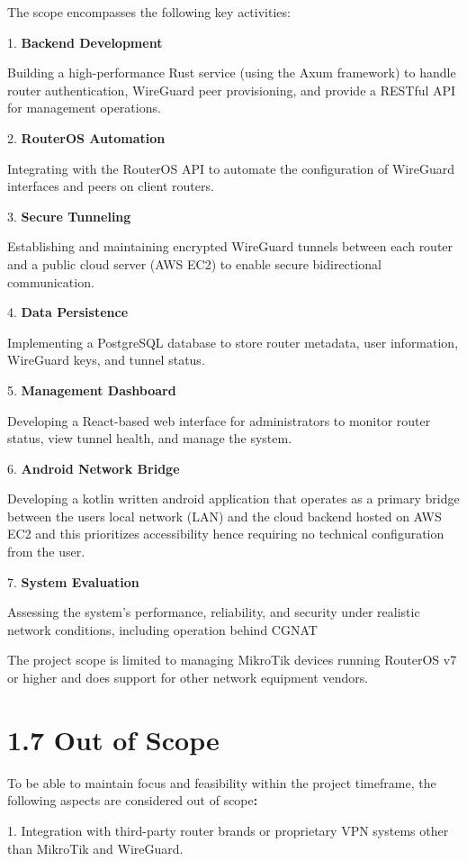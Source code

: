 \documentclass[12pt,a4paper,oneside]{report}
\begin{document}
The scope encompasses the following key activities:


1. \textbf{Backend Development}


Building a high-performance Rust service (using the Axum framework) to handle router authentication, WireGuard peer provisioning, and provide a RESTful API for management operations.


2. \textbf{RouterOS Automation}


Integrating with the RouterOS API to automate the configuration of WireGuard interfaces and peers on client routers.


3. \textbf{Secure Tunneling}


Establishing and maintaining encrypted WireGuard tunnels between each router and a public cloud server (AWS EC2) to enable secure bidirectional communication.


4. \textbf{Data Persistence}


Implementing a PostgreSQL database to store router metadata, user information, WireGuard keys, and tunnel status.


5. \textbf{Management Dashboard}


Developing a React-based web interface for administrators to monitor router status, view tunnel health, and manage the system.


6. \textbf{Android Network Bridge}


Developing a kotlin written android application that operates as a primary bridge between the users local network (LAN) and the cloud backend hosted on AWS EC2 and this prioritizes accessibility hence requiring no technical configuration from the user.


7. \textbf{System Evaluation}


Assessing the system's performance, reliability, and security under realistic network conditions, including operation behind CGNAT  


The project scope is limited to managing MikroTik devices running RouterOS v7 or higher and does support for other network equipment vendors.


\section{1.7 Out of Scope}

To be able to maintain focus and feasibility within the project timeframe, the following aspects are considered out of scope\textbf{:}


1. Integration with third-party router brands or proprietary VPN systems other than MikroTik and WireGuard.
\end{document}
